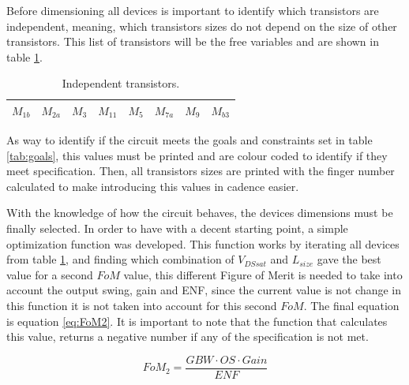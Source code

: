 Before dimensioning all devices is important to identify which transistors are independent, meaning, which transistors sizes do not depend on the size of other transistors. This list of transistors will be the free variables and are shown in table \ref{tab:FreeMos}.


\begin{table}[h]
    \centering
    \caption{Independent transistors.}
    \begin{tabularx}{\textwidth}{>{\centering\arraybackslash}X 
                                >{\centering\arraybackslash}X 
                                >{\centering\arraybackslash}X  
                                >{\centering\arraybackslash}X
                                >{\centering\arraybackslash}X
                                >{\centering\arraybackslash}X
                                >{\centering\arraybackslash}X
                                >{\centering\arraybackslash}X
        }
        \toprule
        $M_{1b}$ & $M_{2a}$ & $M_{3}$ & $M_{11}$ & $M_{5}$ & $M_{7a}$ & $M_{9}$ & $M_{b3}$ \\
        \bottomrule
    \end{tabularx}
    \label{tab:FreeMos}
\end{table}

As way to identify if the circuit meets the goals and constraints set in table \ref{tab:goals}, this values must be printed and are colour coded to identify if they meet specification. Then, all transistors sizes are printed with the finger number calculated to make introducing this values in cadence easier. 

With the knowledge of how the circuit behaves, the devices dimensions must be finally selected. In order to have with a decent starting point, a simple optimization function was developed. This function works by iterating all devices from table \ref{tab:FreeMos}, and finding which combination of $V_{DSsat}$ and $L_{size}$ gave the best value for a second $FoM$ value, this different Figure of Merit is needed to take into account the output swing, gain and ENF, since the current value is not change in this function it is not taken into account for this second $FoM$. The final equation is equation \ref{eq:FoM2}. It is important to note that the function that calculates this value, returns a negative number if any of the specification is not met.

\begin{equation}
    \label{eq:FoM2}
    FoM_2 = \frac{GBW\cdot OS \cdot Gain}{ENF}
\end{equation}